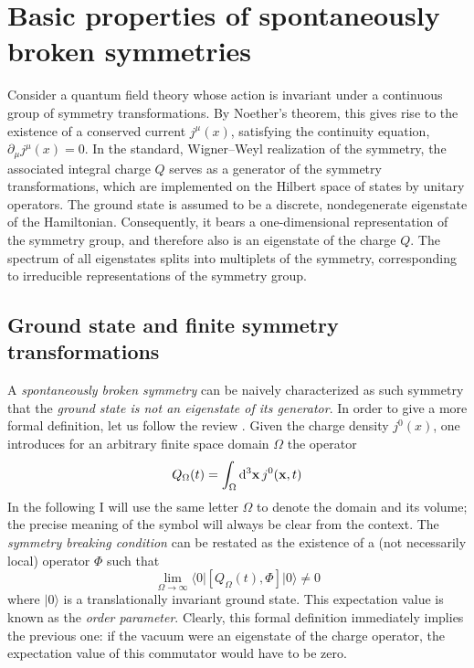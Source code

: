 \documentclass[final,3p,times,12pt,a4paper,sort&compress]{elsarticle}
\newcommand\vek[1]{{\boldsymbol{\bf #1}}}   %
\newcommand\bra[1]{\langle#1\vert}          %
\newcommand\ket[1]{\vert#1\rangle}          %
\newcommand\de{\partial}
\newcommand\dthree{\mathop{{\rm d}^3\!}\nolimits} %
\begin{document}

\section{Basic properties of spontaneously broken symmetries}
\label{sec:basics}

Consider a quantum field theory whose action is invariant under a continuous
group of symmetry transformations. By Noether's theorem, this gives rise to the
existence of a conserved current $j^\mu(x)$, satisfying the continuity
equation, $\de_\mu j^\mu(x)=0$. In the standard, Wigner--Weyl realization of the
symmetry, the associated integral charge $Q$ serves as a generator of the
symmetry transformations, which are implemented on the Hilbert space of states
by unitary operators. The ground state is assumed to be a discrete,
nondegenerate eigenstate of the Hamiltonian. Consequently, it bears a
one-dimensional representation of the symmetry group, and therefore also is an
eigenstate of the charge $Q$. The spectrum of all eigenstates splits into
multiplets of the symmetry, corresponding to irreducible representations of the
symmetry group.


\subsection{Ground state and finite symmetry transformations}
\label{subsec:groundstate} A \emph{spontaneously broken symmetry} can be
naively characterized as such symmetry that the \emph{ground state is not an
eigenstate of its generator}. In order to give a more formal definition, let us
follow the review \cite{Guralnik:1968gu}. Given the charge density $j^0(x)$,
one introduces for an arbitrary finite space domain $\Omega$ the operator
\begin{equation}
Q_\Omega(t)=\int_\Omega\dthree\vek x\,j^0(\vek x,t)
\label{finiteVcharge}
\end{equation}
In the following I will use the same letter $\Omega$ to denote the domain and
its volume; the precise meaning of the symbol will always be clear from the
context. The \emph{symmetry breaking condition} can be restated as the
existence of a (not necessarily local) operator $\Phi$ such that
\begin{equation}
\lim_{\Omega\to\infty}\bra0[Q_\Omega(t),\Phi]\ket0\neq0
\label{SSBcondition}
\end{equation}
where $\ket0$ is a translationally invariant ground state. This expectation
value is known as the \emph{order parameter}. Clearly, this formal definition
immediately implies the previous one: if the vacuum were an eigenstate of the
charge operator, the expectation value of this commutator would have to be
zero.
\end{document}

